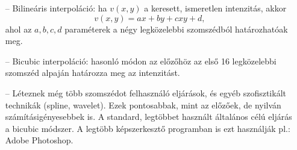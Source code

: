\documentclass[12pt]{article}
\theoremstyle{plain}
\begin{document}
\begin{itemize}
\begin{itemize}
\item[--] Bilineáris interpoláció: ha $v(x,y)$ a keresett, ismeretlen intenzitás, akkor
$$v(x,y) = ax +by +cxy +d, $$
ahol az $a,b,c,d$ paraméterek a négy legközelebbi szomszédból határozhatóak meg.

\item[--] Bicubic interpoláció: hasonló módon az előzőhöz az első 16 legközelebbi szomszéd alpaján határozza meg az intenzitást. 

\item[--] Léteznek még több szomszédot felhasználó eljárások, és egyéb szofisztikált technikák (spline, wavelet). Ezek pontosabbak, mint az előzőek, de nyilván számításigényesebbek is. A standard, legtöbbet használt általános célú eljárás a bicubic módszer. A legtöbb képszerkesztő programban is ezt használják pl.: Adobe Photoshop.
\end{itemize}
\end{itemize}{}
\end{document}
